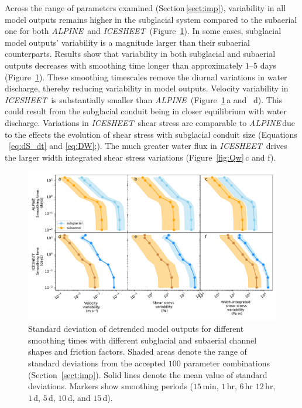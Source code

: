 \documentclass[esurf, manuscript]{copernicus}
\newcommand{\alpine}{\textit{ALPINE}\,}
\newcommand{\icesheet}{\textit{ICESHEET}\,}
\begin{document}
Across the range of parameters examined (Section\,\ref{sect:imp}), variability in all model outputs remains higher in the subglacial system compared to the subaerial one for both \alpine{} and \icesheet{} (Figure~\ref{fig:multi_run}).
In some cases, subglacial model outputs' variability is a magnitude larger than their subaerial counterparts.
Results show that variability in both subglacial and subaerial outputs decreases with smoothing time longer than approximately $1$--$5$ days (Figure~\ref{fig:multi_run}).
These smoothing timescales remove the diurnal variations in water discharge, thereby reducing variability in model outputs. 
Velocity variability in \icesheet{} is substantially smaller than \alpine{} (Figure~\ref{fig:multi_run}\,a and \, d).
This could result from the subglacial conduit being in closer equilibrium with water discharge.
Variations in \icesheet{} shear stress are comparable to \alpine due to the effects the evolution of shear stress with subglacial conduit size (Equations ~\ref{eq:dS_dt} and \ref{eq:DW};). 
The much greater water flux in \icesheet{} drives the larger width integrated shear stress variations (Figure~\ref{fig:Qw}\,c and f).


\begin{figure}[hbt!]
  \centering
  \includegraphics[width=0.9\linewidth]{Fig3.pdf}
  \caption{Standard deviation of detrended model outputs for different smoothing times with different subglacial and subaerial channel shapes and friction factors.
    Shaded areas denote the range of standard deviations from the accepted $100$ parameter combinations (Section~\ref{sect:imp}).
    Solid lines denote the mean value of standard deviations.
    Markers show smoothing periods ($15$\,\unit{min}, $1$\,\unit{hr}, $6$\,\unit{hr} $12$\,\unit{hr}, $1$\,\unit{d}, $5$\,\unit{d}, $10$\,\unit{d}, and $15$\,\unit{d}).
  }
  \label{fig:multi_run}
\end{figure}
\end{document}
